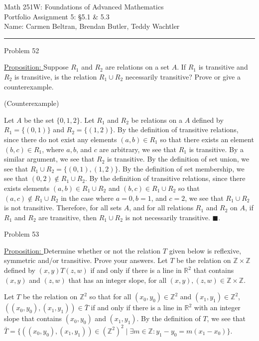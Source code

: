 \documentclass{article}
\theoremstyle{definition}
\newcommand{\header}[3]{
	\begin{center}
	\Large{{#1}} \\
	\smallskip \normalsize {#2} \\
	\smallskip \hfill Name: {#3} \\
	\smallskip \hrule
	\bigskip
	\end{center}}
\newcommand{\problem}[1]{
	\noindent Problem {#1}
	\medskip }
\newcommand{\proposition}{\underline{Proposition: }}
\renewcommand{\proof}{
	\medskip \fbox{Proof}
	\medskip }
\renewcommand{\qed}{\blacksquare}
\newcommand{\set}[1]{\{{#1}\}}
\newcommand{\R}{\mathbb{R}}
\newcommand{\Z}{\mathbb{Z}}
\begin{document}
	\header
	{Math 251W: Foundations of Advanced Mathematics}
	{Portfolio Assignment 5: \S 5.1 \& 5.3}
	{Carmen Beltran, Brendan Butler, Teddy Wachtler}


	\problem{52}

	\proposition
	Suppose $R_1$ and $R_2$ are relations on a set $A$.
	If $R_1$ is transitive and $R_2$ is transitive, is the relation $R_1 \cup R_2$ necessarily transitive?
	Prove or give a counterexample.

	\proof (Counterexample)

	Let $A$ be the set $\set{0, 1, 2}$.
	Let $R_1$ and $R_2$ be relations on a $A$ defined by $R_1 = \set{(0, 1)}$ and $R_2 = \set{(1, 2)}$.
	By the definition of transitive relations, since there do not exist any elements $(a, b) \in R_1$ so that there exists an element $(b, c) \in R_1$, where $a, b$, and $c$ are arbitrary, we see that $R_1$ is transitive.
	By a similar argument, we see that $R_2$ is transitive.
	By the definition of set union, we see that $R_1 \cup R_2 = \set{(0, 1), (1, 2)}$.
	By the definition of set membership, we see that $(0, 2) \not \in R_1 \cup R_2$.
	By the definition of transitive relations, since there exists elements $(a, b) \in R_1 \cup R_2$ and $(b, c) \in R_1 \cup R_2$ so that $(a, c) \not \in R_1 \cup R_2$ in the case where $a = 0, b = 1$, and $c = 2$, we see that $R_1 \cup R_2$ is not transitive.
	Therefore, for all sets $A$, and for all relations $R_1$ and $R_2$ on $A$, if $R_1$ and $R_2$ are transitive, then $R_1 \cup R_2$ is not necessarily transitive.
	$\qed$.

	\bigskip


	\problem{53}

	\proposition
	Determine whether or not the relation $T$ given below is reflexive, symmetric and/or transitive.
	Prove your answers.
	Let $T$ be the relation on $\Z  \times \Z$ defined by $(x, y) T (z, w)$ if and only if there is a line in $\R^2$ that contains $(x, y)$ and $(z, w)$ that has an integer slope, for all $(x, y), (z, w) \in \Z \times \Z$.

	\proof

	Let $T$ be the relation on $\Z^2$ so that for all $(x_0, y_0) \in \Z^2$ and $(x_1, y_1) \in \Z^2$, $((x_0, y_0), (x_1, y_1)) \in \bar T$ if and only if there is a line in $\R^2$ with an integer slope that contains $(x_0, y_0)$ and $(x_1, y_1)$.
	By the definition of $T$, we see that $\bar T = \set{((x_0, y_0), (x_1, y_1)) \in (\Z^2)^2 \mid \exists m \in \Z : y_1 - y_0 = m(x_1 - x_0)}$.
\end{document}

